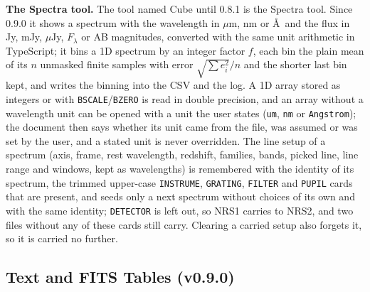 \documentclass[11pt,a4paper]{article}
\newcommand{\code}[1]{\texttt{\small #1}}
\begin{document}
    \textbf{The Spectra tool.} The tool named Cube until 0.8.1 is the Spectra tool. Since 0.9.0 it shows a spectrum with the wavelength in $\mu$m, nm or \AA\ and the flux in Jy, mJy, $\mu$Jy, $F_\lambda$ or AB magnitudes, converted with the same unit arithmetic in TypeScript; it bins a 1D spectrum by an integer factor $f$, each bin the plain mean of its $n$ unmasked finite samples with error $\sqrt{\sum e_i^2}/n$ and the shorter last bin kept, and writes the binning into the CSV and the log. A 1D array stored as integers or with \code{BSCALE}/\code{BZERO} is read in double precision, and an array without a wavelength unit can be opened with a unit the user states (\code{um}, \code{nm} or \code{Angstrom}); the document then says whether its unit came from the file, was assumed or was set by the user, and a stated unit is never overridden. The line setup of a spectrum (axis, frame, rest wavelength, redshift, families, bands, picked line, line range and windows, kept as wavelengths) is remembered with the identity of its spectrum, the trimmed upper-case \code{INSTRUME}, \code{GRATING}, \code{FILTER} and \code{PUPIL} cards that are present, and seeds only a next spectrum without choices of its own and with the same identity; \code{DETECTOR} is left out, so NRS1 carries to NRS2, and two files without any of these cards still carry. Clearing a carried setup also forgets it, so it is carried no further.

    \subsection{Text and FITS Tables (v0.9.0)}
    \label{sec:tables}
\end{document}
